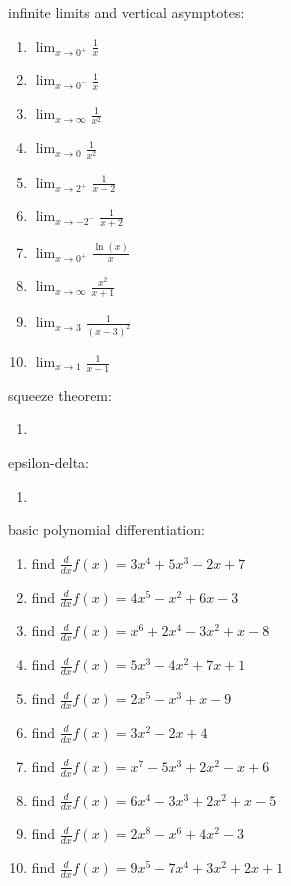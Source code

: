 \documentclass{article}
\begin{document}
infinite limits and vertical asymptotes:
\begin{enumerate}
        \item $\lim_{x \to 0^+} \frac{1}{x}$
        \item $\lim_{x \to 0^-} \frac{1}{x}$
        \item $\lim_{x \to \infty} \frac{1}{x^2}$
        \item $\lim_{x \to 0} \frac{1}{x^2}$
        \item $\lim_{x \to 2^+} \frac{1}{x-2}$
        \item $\lim_{x \to -2^-} \frac{1}{x+2}$
        \item $\lim_{x \to 0^+} \frac{\ln(x)}{x}$
        \item $\lim_{x \to \infty} \frac{x^2}{x+1}$
        \item $\lim_{x \to 3} \frac{1}{(x-3)^2}$
        \item $\lim_{x \to 1} \frac{1}{x-1}$
\end{enumerate}

squeeze theorem:
\begin{enumerate}
	\item
\end{enumerate}

epsilon-delta:
\begin{enumerate}
	\item
\end{enumerate}

basic polynomial differentiation:
\begin{enumerate}
	\item find $\frac{d}{dx}f(x) = 3x^4 + 5x^3 - 2x + 7$
	\item find $\frac{d}{dx}f(x) = 4x^5 - x^2 + 6x - 3$
	\item find $\frac{d}{dx}f(x) = x^6 + 2x^4 - 3x^2 + x - 8$
	\item find $\frac{d}{dx}f(x) = 5x^3 - 4x^2 + 7x + 1$
	\item find $\frac{d}{dx}f(x) = 2x^5 - x^3 + x - 9$
	\item find $\frac{d}{dx}f(x) = 3x^2 - 2x + 4$
	\item find $\frac{d}{dx}f(x) = x^7 - 5x^3 + 2x^2 - x + 6$
	\item find $\frac{d}{dx}f(x) = 6x^4 - 3x^3 + 2x^2 + x - 5$
	\item find $\frac{d}{dx}f(x) = 2x^8 - x^6 + 4x^2 - 3$
	\item find $\frac{d}{dx}f(x) = 9x^5 - 7x^4 + 3x^2 + 2x + 1$
\end{enumerate}
\end{document}
